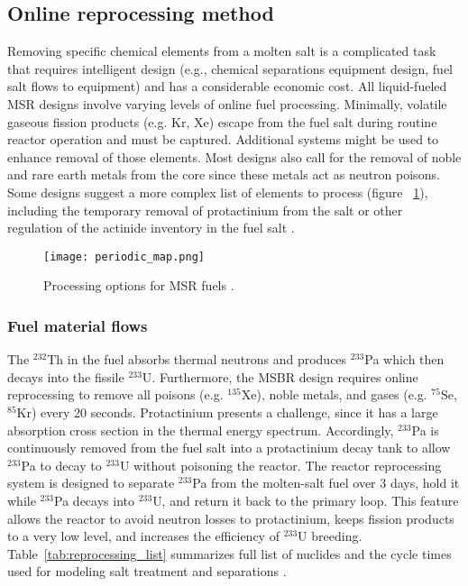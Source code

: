 \subsection{Online reprocessing method}
Removing specific chemical elements from a molten salt is a complicated task 
that requires intelligent design (e.g., chemical separations equipment design, 
fuel salt flows to equipment) and has a considerable economic cost. All 
liquid-fueled \gls{MSR} designs involve varying levels of online fuel 
processing. Minimally, volatile gaseous fission products (e.g. Kr, Xe) escape 
from the fuel salt during routine reactor operation and must be captured. 
Additional systems might be used to enhance removal of those elements. Most 
designs also call for the removal of noble and rare earth metals from the core 
since these metals act as neutron poisons. Some designs suggest a more complex 
list of elements to process (figure ~\ref{fig:periodic_tab}), including the 
temporary removal of protactinium from the salt or other regulation of the 
actinide inventory in the fuel salt \cite{ahmad_neutronics_2015}.

\begin{figure}[htp!] %
  \centering
  \texttt{[image: periodic\_map.png]}
  \caption{Processing options for \gls{MSR} fuels \cite{ahmad_neutronics_2015}.}
  \label{fig:periodic_tab}
\end{figure}

\subsubsection{Fuel material flows}
The $^{232}$Th in the fuel absorbs thermal neutrons and produces $^{233}$Pa 
which then decays into the fissile $^{233}$U. Furthermore, the \gls{MSBR} design 
requires online reprocessing to remove all poisons (e.g. $^{135}$Xe), noble 
metals, and gases (e.g. $^{75}$Se, $^{85}$Kr) every 20 seconds. Protactinium 
presents a challenge, since it has a large absorption cross section in the 
thermal energy spectrum. Accordingly, $^{233}$Pa is continuously removed from 
the fuel salt into a protactinium decay tank to allow $^{233}$Pa to decay to 
$^{233}$U without poisoning the reactor. The reactor reprocessing system is 
designed to separate $^{233}$Pa from the molten-salt fuel over 3 days, hold it 
while $^{233}$Pa decays into $^{233}$U, and return it back to the primary loop. 
This feature allows the reactor to avoid neutron losses to protactinium, keeps 
fission products to a very low level, and increases the efficiency of $^{233}$U 
breeding. Table~\ref{tab:reprocessing_list} summarizes full list of nuclides and 
the cycle times used for modeling salt treatment and separations 
\cite{robertson_conceptual_1971}. 

